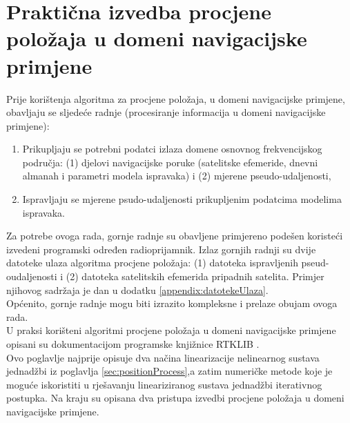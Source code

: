 \documentclass[a4paper,twoside,12pt]{memoir} %
\begin{document}
\chapter{Praktična izvedba procjene položaja u domeni navigacijske primjene}\label{sec:izvedba}
Prije korištenja algoritma za procjene položaja, u domeni navigacijske primjene,
obavljaju se sljedeće radnje (procesiranje informacija u domeni navigacijske primjene):
\begin{enumerate}
	\item Prikupljaju se potrebni podatci izlaza domene osnovnog frekvencijskog područja: (1) djelovi navigacijske poruke (satelitske efemeride, dnevni almanah i parametri modela ispravaka) i (2) mjerene pseudo-udaljenosti,
	\item Ispravljaju se mjerene psudo-udaljenosti prikupljenim podatcima modelima ispravaka.
\end{enumerate}
Za potrebe ovoga rada, gornje radnje su obavljene primjereno podešen koristeći izvedeni programski određen radioprijamnik. 
Izlaz gornjih radnji su dvije datoteke ulaza algoritma procjene položaja: (1) datoteka 
ispravljenih pseud-oudaljenosti i (2) datoteka satelitskih efemerida pripadnih satelita.
Primjer njihovog sadržaja je dan u dodatku \ref{appendix:datotekeUlaza}.\\
Općenito, gornje radnje mogu biti izrazito kompleksne i prelaze obujam ovoga rada.\\
U praksi korišteni algoritmi procjene položaja u domeni navigacijske primjene opisani su dokumentacijom programske knjižnice RTKLIB \cite{ref:36}. \\
Ovo poglavlje najprije opisuje dva načina linearizacije nelinearnog sustava jednadžbi iz poglavlja \ref{sec:positionProcess},a zatim numeričke metode koje je moguće iskoristiti u rješavanju lineariziranog sustava jednadžbi iterativnog postupka. Na kraju su opisana dva pristupa izvedbi procjene položaja u domeni navigacijske primjene.
\vspace{0.2cm}
\end{document}
